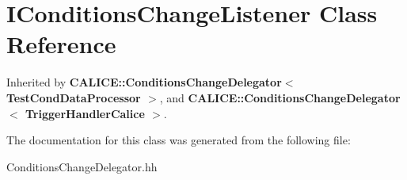 \section{IConditionsChangeListener Class Reference}
\label{classlccd_1_1IConditionsChangeListener}


Inherited by {\bf CALICE::ConditionsChangeDelegator$<$ TestCondDataProcessor $>$}, and {\bf CALICE::ConditionsChangeDelegator$<$ TriggerHandlerCalice $>$}.

The documentation for this class was generated from the following file:\begin{DoxyCompactItemize}
\item 
ConditionsChangeDelegator.hh\end{DoxyCompactItemize}
